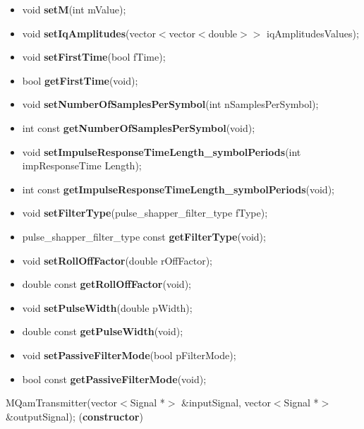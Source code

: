 \begin{itemize}
     \item void \textbf{setM}(int mValue);
     \item void \textbf{setIqAmplitudes}(vector$<$vector$<$double$>>$ iqAmplitudesValues);
     \item void \textbf{setFirstTime}(bool fTime);
     \item bool \textbf{getFirstTime}(void);
     \item void \textbf{setNumberOfSamplesPerSymbol}(int nSamplesPerSymbol);
     \item int const \textbf{getNumberOfSamplesPerSymbol}(void);
     \item void \textbf{setImpulseResponseTimeLength\_symbolPeriods}(int impResponseTime Length);
     \item int const \textbf{getImpulseResponseTimeLength\_symbolPeriods}(void);
     \item void \textbf{setFilterType}(pulse\_shapper\_filter\_type fType);
     \item pulse\_shapper\_filter\_type const \textbf{getFilterType}(void);
     \item void \textbf{setRollOffFactor}(double rOffFactor);
     \item double const \textbf{getRollOffFactor}(void);
     \item void \textbf{setPulseWidth}(double pWidth);
     \item double const \textbf{getPulseWidth}(void);
     \item void \textbf{setPassiveFilterMode}(bool pFilterMode);
     \item bool const \textbf{getPassiveFilterMode}(void);
\end{itemize}

MQamTransmitter(vector$<$Signal *$>$ \&inputSignal, vector$<$Signal *$>$ \&outputSignal); (\textbf{constructor})
\bigbreak

